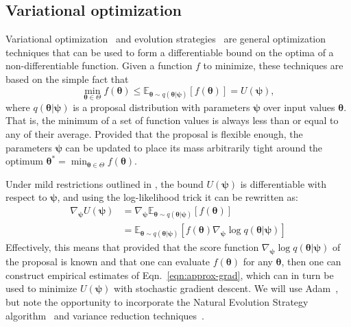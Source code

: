 \documentclass[twocolumn,superscriptaddress,aps]{revtex4-1}
\newcommand{\bftheta}{{\bm \theta}}
\newcommand{\bfpsi}{{\bm \psi}}
\theoremstyle{plain}
\begin{document}
\subsection{Variational optimization}

Variational optimization~\cite{2012arXiv1212.4507S,staines2013optimization} and evolution strategies~\citep{2011arXiv1106.4487W} are general
optimization techniques that can be used to form a differentiable bound
on the optima of a non-differentiable function. Given a function $f$ to minimize,
these techniques are based on the simple fact that
\begin{equation}
    \min_{\bftheta \in {\Theta}} f(\bftheta) \leq \mathbb{E}_{\bftheta \sim q(\bftheta|\bfpsi)} [f(\bftheta)] = U(\bfpsi),
\end{equation}
where $q(\bftheta|\bfpsi)$ is a proposal distribution with parameters $\bfpsi$ over input values $\bftheta$.
That is, the minimum of a set of function values is always less than or equal
to any of their average. Provided that the proposal is flexible enough, the parameters $\bfpsi$
can be updated to place its mass arbitrarily tight around the optimum $\bftheta^* = \min_{\bftheta \in \Theta} f(\bftheta)$.

Under mild restrictions outlined in  \citep{2012arXiv1212.4507S}, the bound
$U(\bfpsi)$ is differentiable with respect to $\bfpsi$, and using the log-likelihood
trick it can be rewritten as:
\begin{align}\label{eqn:approx-grad}
    \nabla_\bfpsi U(\bfpsi) &= \nabla_\bfpsi \mathbb{E}_{\bftheta \sim q(\bftheta|\bfpsi)} [f(\bftheta)] \nonumber \\
    &= \mathbb{E}_{\bftheta \sim q(\bftheta|\bfpsi)} [f(\bftheta) \nabla_\bfpsi \log q(\bftheta|\bfpsi)]
\end{align}
Effectively, this means that provided that the score function $\nabla_\bfpsi \log
q(\bftheta|\bfpsi)$ of the proposal is known and that one can evaluate
$f(\mathbf{\bftheta})$ for any $\bftheta$, then one can construct empirical
estimates of Eqn.~\ref{eqn:approx-grad}, which can in turn be used to minimize
$U(\bfpsi)$ with stochastic gradient descent. We will use 
Adam~\cite{2014arXiv1412.6980K}, but note the opportunity to incorporate the Natural Evolution Strategy
algorithm~\citep{2011arXiv1106.4487W} and variance reduction techniques~\citep{ranganath2014black}.
\end{document}
